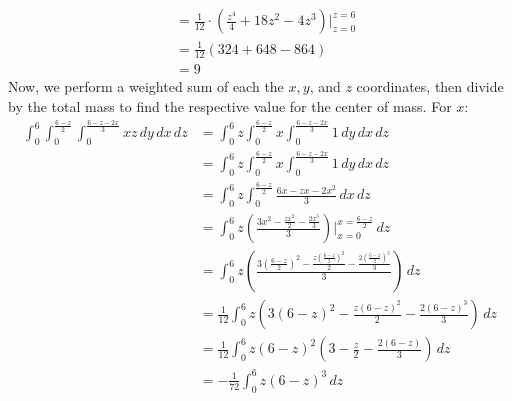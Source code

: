 \documentclass[12pt]{exam}
\begin{document}
\begin{questions}
\begin{solution}
\begin{align*}
            &= \frac{1}{12} \cdot \left(\frac{z^4}{4} + 18z^2 - 4z^3  \right)|_{z=0}^{z=6} \\
            &= \frac{1}{12}(324 + 648 - 864) \\
            &= \boxed{9} 
        \end{align*}
        Now, we perform a weighted sum of each the $x, y$, and $z$ coordinates, then divide by the total mass to find the respective value for the center of mass.
        For $x$:
        \begin{align*}
            \int_{0}^{6}\int_{0}^{\frac{6 - z}{2}}\int_{0}^{\frac{6 - z - 2x}{3}} xz\, dy\, dx\, dz &= \int_{0}^{6}z\int_{0}^{\frac{6 - z}{2}}x\int_{0}^{\frac{6 - z - 2x}{3}} 1 \, dy\, dx\, dz \\ 
            &= \int_{0}^{6}z\int_{0}^{\frac{6 - z}{2}}x\int_{0}^{\frac{6 - z - 2x}{3}} 1 \, dy \, dx\, dz \\
            &= \int_{0}^{6}z \int_{0}^{\frac{6 - z}{2}}\frac{6x - zx - 2x^2}{3} \, dx\, dz \\
            &= \int_{0}^{6}z \left(\frac{3x^2 - \frac{zx^2}{2} - \frac{2x^3}{3}}{3}\right)|_{x=0}^{x = \frac{6 - z}{2}} \, dz \\
            &= \int_{0}^{6}z \left(\frac{3\left(\frac{6 - z}{2}\right)^2 - \frac{z\left(\frac{6 - z}{2}\right)^2}{2} - \frac{2\left(\frac{6 - z}{2}\right)^3}{3}}{3}\right)\, dz \\
            &= \frac{1}{12}\int_{0}^{6}z \left(3\left(6 - z\right)^2 - \frac{z\left(6 - z\right)^2}{2} - \frac{2\left(6 - z\right)^3}{3}\right)\, dz \\
            &= \frac{1}{12}\int_{0}^{6}z (6-z)^2\left(3 - \frac{z}{2} - \frac{2\left(6 - z\right)}{3}\right)\, dz \\
            &= -\frac{1}{72}\int_{0}^{6}z (6-z)^3\, dz
        \end{align*}
    \end{solution}
    

\end{questions}
\end{document}

